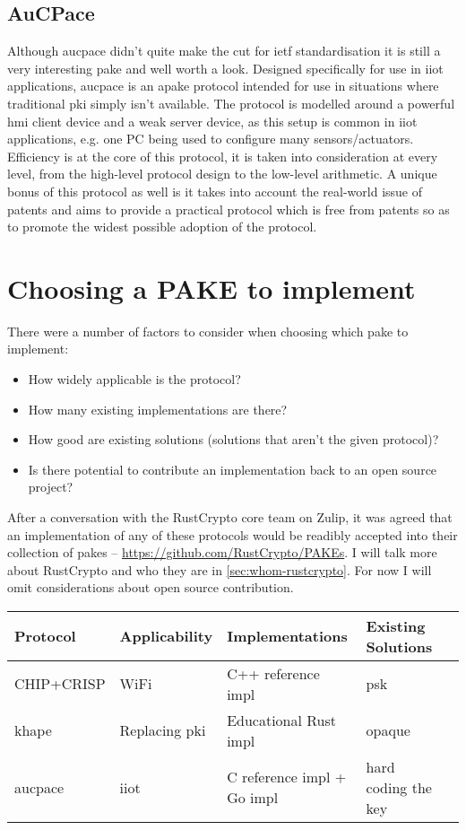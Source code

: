 \subsection{AuCPace}
Although \gls{aucpace} \cite{aucpace} didn't quite make the cut for \gls{ietf} standardisation it is still a very interesting \gls{pake} and well worth a look.
Designed specifically for use in \gls{iiot} applications, \gls{aucpace} is an \gls{apake} protocol intended for use in situations where traditional \gls{pki} simply isn't available.
The protocol is modelled around a powerful \gls{hmi} client device and a weak server device, as this setup is common in \gls{iiot} applications, e.g. one PC being used to configure many sensors/actuators.
Efficiency is at the core of this protocol, it is taken into consideration at every level, from the high-level protocol design to the low-level arithmetic.
A unique bonus of this protocol as well is it takes into account the real-world issue of patents and aims to provide a practical protocol which is free from patents so as to promote the widest possible adoption of the protocol.

\clearpage
\section{Choosing a PAKE to implement}
There were a number of factors to consider when choosing which \gls{pake} to implement:
\begin{itemize}
  \item{How widely applicable is the protocol?}
  \item{How many existing implementations are there?}
  \item{How good are existing solutions (solutions that aren't the given protocol)?}
  \item{Is there potential to contribute an implementation back to an open source project?}
\end{itemize}

After a conversation with the RustCrypto core team on Zulip, it was agreed that an implementation of any of these protocols would be readibly accepted into their collection of \glspl{pake} -- \url{https://github.com/RustCrypto/PAKEs}.
I will talk more about RustCrypto and who they are in \cref{sec:whom-rustcrypto}.
For now I will omit considerations about open source contribution.

\begin{center}
  \small
  \begin{tabular}{ lllll }
    \toprule
    Protocol & Applicability & Implementations & Existing Solutions \\
    \midrule
    CHIP+CRISP & WiFi & C++ reference impl & \gls{psk} \\
    \gls{khape} & Replacing \gls{pki} & Educational Rust impl & \gls{opaque} \\
    \gls{aucpace} & \gls{iiot} & C reference impl + Go impl & hard coding the key \\
    \bottomrule
  \end{tabular}
\end{center}

